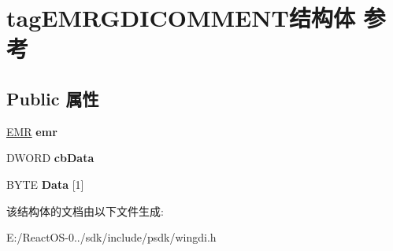 \hypertarget{structtag_e_m_r_g_d_i_c_o_m_m_e_n_t}{}\section{tag\+E\+M\+R\+G\+D\+I\+C\+O\+M\+M\+E\+N\+T结构体 参考}
\label{structtag_e_m_r_g_d_i_c_o_m_m_e_n_t}
\subsection*{Public 属性}
\begin{DoxyCompactItemize}
\item 
\mbox{\label{structtag_e_m_r_g_d_i_c_o_m_m_e_n_t_a287755b8317203bee1b27240fb313a1d}} 
\hyperlink{structtag_e_m_r}{E\+MR} {\bfseries emr}
\item 
\mbox{\label{structtag_e_m_r_g_d_i_c_o_m_m_e_n_t_a72ba68b2d66ead4578e61c6b7b40a3cf}} 
D\+W\+O\+RD {\bfseries cb\+Data}
\item 
\mbox{\label{structtag_e_m_r_g_d_i_c_o_m_m_e_n_t_a47d99c24991ace90eb72f43aa4f84ec3}} 
B\+Y\+TE {\bfseries Data} \mbox{[}1\mbox{]}
\end{DoxyCompactItemize}


该结构体的文档由以下文件生成\+:\begin{DoxyCompactItemize}
\item 
E\+:/\+React\+O\+S-\/0../sdk/include/psdk/wingdi.\+h\end{DoxyCompactItemize}

